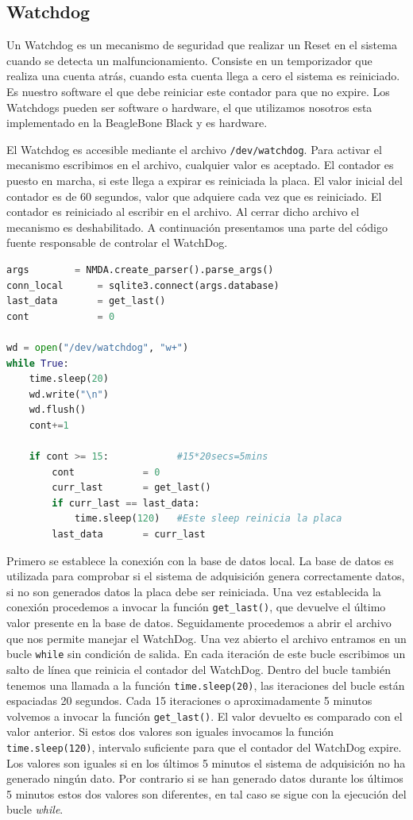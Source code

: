 	\subsection{Watchdog}
		Un Watchdog \cite{WatchDogWiki} es un mecanismo de seguridad que realizar un Reset en el sistema cuando se detecta un
		malfuncionamiento. Consiste en un temporizador que realiza una cuenta atrás, cuando esta cuenta llega a cero el sistema es reiniciado.
		Es nuestro software el que debe reiniciar este contador para que no expire. Los Watchdogs pueden ser software o hardware, el que
		utilizamos nosotros esta implementado en la BeagleBone Black y es hardware.
		\par
		El Watchdog es accesible mediante el archivo \texttt{/dev/watchdog}. Para activar el mecanismo escribimos en el archivo, cualquier
		valor es aceptado. El contador es puesto en marcha, si este llega a expirar es reiniciada la placa. El valor inicial del contador es
		de 60 segundos, valor que adquiere cada vez que es reiniciado. El contador es reiniciado al escribir en el archivo. Al cerrar dicho
		archivo el mecanismo es deshabilitado. A continuación presentamos una parte del código fuente responsable de controlar el WatchDog.
		\begin{lstlisting}[language=Python]
args		= NMDA.create_parser().parse_args()
conn_local      = sqlite3.connect(args.database)
last_data       = get_last()
cont            = 0

wd = open("/dev/watchdog", "w+")
while True:
    time.sleep(20)
    wd.write("\n")
    wd.flush()
    cont+=1

    if cont >= 15:            #15*20secs=5mins
        cont            = 0
        curr_last       = get_last()
        if curr_last == last_data:
            time.sleep(120)   #Este sleep reinicia la placa
        last_data       = curr_last
		\end{lstlisting}
		Primero se establece la conexión con la base de datos local. La base de datos es utilizada para comprobar si el sistema de adquisición
		genera correctamente datos, si no son generados datos la placa debe ser reiniciada. Una vez establecida la conexión procedemos a
		invocar la función \texttt{get\_last()}, que devuelve el último valor presente en la base de datos. Seguidamente procedemos a abrir el
		archivo  que nos permite manejar el WatchDog. Una vez abierto el archivo entramos en un bucle \texttt{while} sin condición de salida.
		En cada iteración de este bucle escribimos un salto de línea que reinicia el contador del WatchDog. Dentro del bucle también tenemos
		una llamada a la función \texttt{time.sleep(20)}, las iteraciones del bucle están espaciadas 20 segundos. Cada 15 iteraciones o
		aproximadamente 5 minutos volvemos a invocar la función \texttt{get\_last()}. El valor devuelto es comparado con el valor anterior. Si
		estos dos valores son iguales invocamos la función \texttt{time.sleep(120)}, intervalo suficiente para que el contador del WatchDog
		expire. Los valores son iguales si en los últimos 5 minutos el sistema de adquisición no ha generado ningún dato. Por contrario si se
		han generado datos durante los últimos 5 minutos estos dos valores son diferentes, en tal caso se sigue con la ejecución del bucle
		\emph{while}. 
